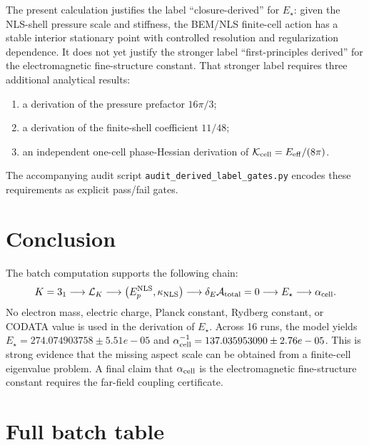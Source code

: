 \documentclass[11pt]{article}
\newcommand{\LK}{\mathcal L_K}
\newcommand{\Estar}{E_\star}
\newcommand{\alphacell}{\alpha_{\rm cell}}
\begin{document}
The present calculation justifies the label ``closure-derived'' for
\(E_\star\): given the NLS-shell pressure scale and stiffness, the BEM/NLS
finite-cell action has a stable interior stationary point with controlled
resolution and regularization dependence.  It does not yet justify the stronger
label ``first-principles derived'' for the electromagnetic fine-structure
constant.  That stronger label requires three additional analytical results:
\begin{enumerate}
\item a derivation of the pressure prefactor \(16\pi/3\);
\item a derivation of the finite-shell coefficient \(11/48\);
\item an independent one-cell phase-Hessian derivation of
      \(\mathcal K_{\rm cell}=E_{\rm eff}/(8\pi)\).
\end{enumerate}
The accompanying audit script \texttt{audit\_derived\_label\_gates.py} encodes
these requirements as explicit pass/fail gates.

\section{Conclusion}

The batch computation supports the following chain:
\[
K=3_1
\longrightarrow
\LK
\longrightarrow
\left(E_p^{\rm NLS},\kappa_{\rm NLS}\right)
\longrightarrow
\delta_E\mathcal A_{\rm total}=0
\longrightarrow
\Estar
\longrightarrow
\alphacell.
\]
No electron mass, electric charge, Planck constant, Rydberg constant, or CODATA value is used in the derivation of \(\Estar\). Across 16 runs, the model yields \(\Estar=274.074903758\pm 5.51e-05\) and \(\alphacell^{-1}=137.035953090\pm 2.76e-05\). This is strong evidence that the missing aspect scale can be obtained from a finite-cell eigenvalue problem. A final claim that \(\alphacell\) is the electromagnetic fine-structure constant requires the far-field coupling certificate.

\appendix
\section{Full batch table}
\end{document}
